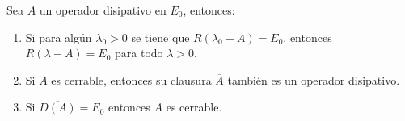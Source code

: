 \begin{Teorema}
    \label{ch:semigrupos:th:PropsOpDisipativos}

    Sea $A$ un operador disipativo en $E_0$, entonces:

    \begin{enumerate}
        \item Si para algún $\lambda_0 > 0$ se tiene que $R(\lambda_0 - A) = E_0$, entonces $R(\lambda - A) = E_0$ para todo $\lambda > 0$.

        \item Si $A$ es cerrable\footnotemark, entonces su clausura $\overline{A}$ también es un operador disipativo.

        \item Si $\overline{D(A)} = E_0$ entonces $A$ es cerrable.
    \end{enumerate}
\end{Teorema}
